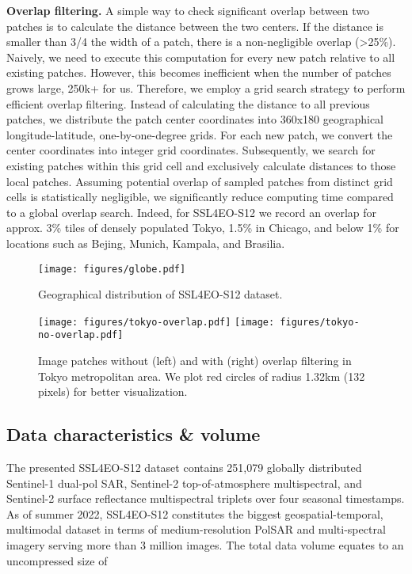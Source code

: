 \documentclass[lettersize,journal]{IEEEtran}
\begin{document}
\textbf{Overlap filtering.} A simple way to check significant overlap between two patches is to calculate the distance between the two centers. If the distance is smaller than 3/4 the width of a patch, there is a non-negligible overlap (>25\%). Naively, we need to execute this computation for every new patch relative to all existing patches. However, this becomes inefficient when the number of patches grows large, 250k+ for us. 
Therefore, we employ a grid search strategy to perform efficient overlap filtering. Instead of calculating
the distance to all previous patches, we distribute the patch center coordinates into 360x180 geographical longitude-latitude, one-by-one-degree grids. For each new patch, we convert the center coordinates into integer grid coordinates. Subsequently, we search for existing patches within this grid cell
and exclusively calculate distances to those local patches. Assuming potential overlap of sampled patches
from distinct grid cells is statistically negligible, we significantly reduce computing time compared
to a global overlap search. Indeed, for SSL4EO-S12 we record an overlap for approx. 3\% tiles of densely populated Tokyo, 1.5\% in Chicago, and below 1\% for locations such as Bejing, Munich, Kampala, and Brasilia.


\begin{figure}
  \centering
  \texttt{[image: figures/globe.pdf]}
  \caption{Geographical distribution of SSL4EO-S12 dataset.}
  \label{fig:globe}
\end{figure}

\begin{figure}[t!]
  \centering
  \texttt{[image: figures/tokyo-overlap.pdf]}
  \texttt{[image: figures/tokyo-no-overlap.pdf]}  
  \caption{Image patches without (left) and with (right) overlap filtering in Tokyo metropolitan area.
  We plot red circles of radius 1.32km (132 pixels) for better visualization.}
  \label{fig:overlap}
  \vspace{-1em}
\end{figure}

\vspace{-1em}
\subsection{Data characteristics \& volume}

The presented SSL4EO-S12 dataset contains 251,079 globally distributed Sentinel-1 dual-pol SAR, Sentinel-2 top-of-atmosphere multispectral, and Sentinel-2 surface reflectance multispectral triplets over four seasonal timestamps. As of summer 2022, SSL4EO-S12 constitutes the biggest geospatial-temporal, multimodal dataset in terms of medium-resolution PolSAR and multi-spectral imagery serving more than 3 million images. The total data volume equates to an uncompressed size of 
\end{document}
